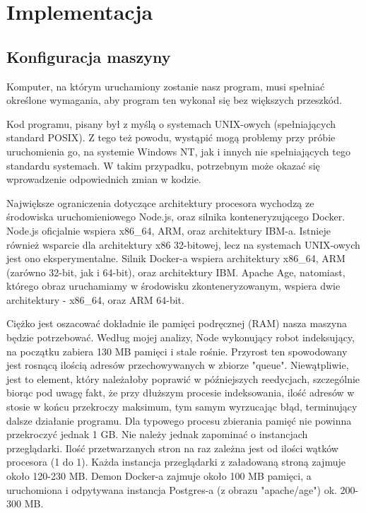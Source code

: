 \documentclass[a4paper, 12pt]{article}
\begin{document}
\section{Implementacja}
\subsection{Konfiguracja maszyny}
Komputer, na którym uruchamiony zostanie nasz program, musi spełniać określone wymagania, aby program ten wykonał się bez większych przeszkód.

Kod programu, pisany był z myślą o systemach UNIX-owych (spełniających standard POSIX). Z tego też powodu, wystąpić mogą problemy przy próbie uruchomienia go, na systemie Windows NT, jak i innych nie spełniających tego standardu systemach. W takim przypadku, potrzebnym może okazać się wprowadzenie odpowiednich zmian w kodzie.

Największe ograniczenia dotyczące architektury procesora wychodzą ze środowiska uruchomieniowego Node.js, oraz silnika konteneryzującego Docker. Node.js oficjalnie wspiera x86\_64, ARM, oraz architektury IBM-a. Istnieje również wsparcie dla architektury x86 32-bitowej, lecz na systemach UNIX-owych jest ono eksperymentalne.\cite{archNodeBuilding} Silnik Docker-a wspiera architektury x86\_64, ARM (zarówno 32-bit, jak i 64-bit), oraz architektury IBM.\cite{archApacheAgeDocker} Apache Age, natomiast, którego obraz uruchamiamy w środowisku zkonteneryzowanym, wspiera dwie architektury - x86\_64, oraz ARM 64-bit.\cite{archInstallDockerEngine}

Ciężko jest oszacować dokładnie ile pamięci podręcznej (RAM) nasza maszyna będzie potrzebować. Według mojej analizy, Node wykonujący robot indeksujący, na początku zabiera 130 MB pamięci i stale rośnie. Przyrost ten spowodowany jest rosnącą ilością adresów przechowywanych w zbiorze "queue". Niewątpliwie, jest to element, który należałoby poprawić w późniejszych reedycjach, szczególnie biorąc pod uwagę fakt, że przy dłuższym procesie indeksowania, ilość adresów w stosie w końcu przekroczy maksimum, tym samym wyrzucając błąd, terminujący dalsze działanie programu. Dla typowego procesu zbierania pamięć nie powinna przekroczyć jednak 1 GB. Nie należy jednak zapominać o instancjach przeglądarki. Ilość przetwarzanych stron na raz zależna jest od ilości wątków procesora (1 do 1). Każda instancja przeglądarki z załadowaną stroną zajmuje około 120-230 MB. Demon Docker-a zajmuje około 100 MB pamięci, a uruchomiona i odpytywana instancja Postgres-a (z obrazu "apache/age") ok. 200-300 MB.
\end{document}
